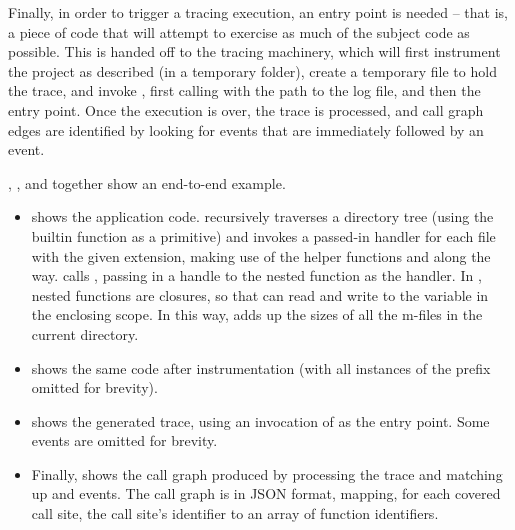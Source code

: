 Finally, in order to trigger a tracing execution, an entry point is needed --
that is, a piece of code that will attempt to exercise as much of the subject
code as possible. This is handed off to the tracing machinery, which will first
instrument the project as described (in a temporary folder), create a temporary
file to hold the trace, and invoke \matlab, first calling
 with the path to the log file, and then the
entry point. Once the execution is over, the trace is processed, and call
graph edges are identified by looking for  events that are
immediately followed by an  event.

, ,
 and  together show an
end-to-end example.

\begin{itemize}

\item {} shows the application code.
   recursively traverses a directory tree (using the
  builtin function  as a primitive) and invokes a passed-in handler
  for each file with the given extension, making use of the helper functions
   and  along the way. 
  calls , passing in a handle to the nested function
   as the handler. In \matlab, nested functions are closures,
  so that  can read and write to the 
  variable in the enclosing scope. In this way,  adds up the
  sizes of all the m-files in the current directory.

\item {} shows the same code after instrumentation
  (with all instances of the  prefix omitted for
  brevity).

\item {} shows the generated trace, using an invocation
  of  as the entry point. Some events are omitted for brevity.

\item Finally,  shows the call graph produced by
  processing the trace and matching up  and  events.
  The call graph is in JSON format, mapping, for each covered call site, the
  call site's identifier to an array of function identifiers.

\end{itemize}

